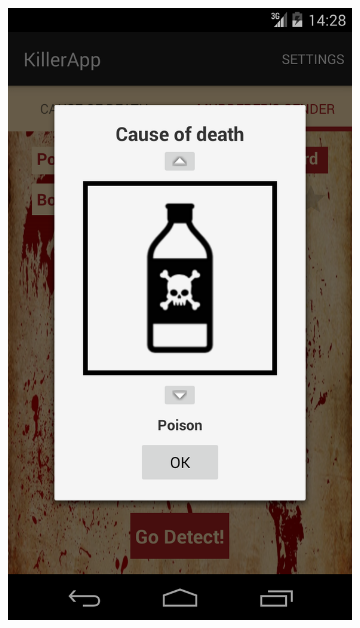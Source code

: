 \documentclass{mproj}
\begin{document}
\begin{figure}[h]
	\centering
	\begin{subfigure}{0.25\textwidth}
		\includegraphics[width=\textwidth]{images/spinner_selector}		
	\end{subfigure}		
	\quad
	\begin{subfigure}{0.25\textwidth}

\end{subfigure}
\end{figure}
\end{document}
